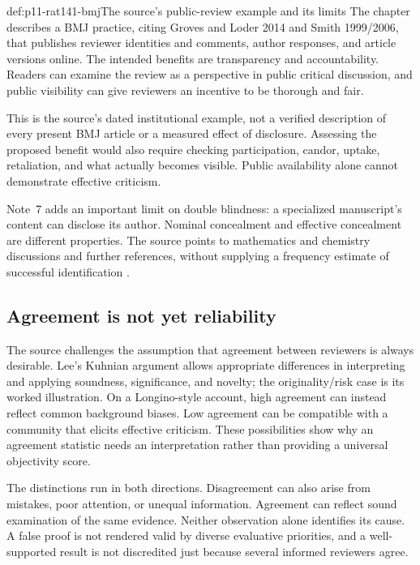 \begin{hbexample}{def:p11-rat141-bmj}{The source's public-review example and its limits}
The chapter describes a BMJ practice, citing Groves and Loder 2014
and Smith 1999/2006, that publishes reviewer identities and comments,
author responses, and article versions online. The intended benefits
are transparency and accountability. Readers can examine the review
as a perspective in public critical discussion, and public visibility
can give reviewers an incentive to be thorough and fair.

This is the source's dated institutional example, not a verified
description of every present BMJ article or a measured effect of
disclosure. Assessing the proposed benefit would also require checking
participation, candor, uptake, retaliation, and what actually becomes
visible. Public availability alone cannot demonstrate effective criticism.
\end{hbexample}

Note~7 adds an important limit on double blindness: a specialized
manuscript's content can disclose its author. Nominal concealment and
effective concealment are different properties. The source points to
mathematics and chemistry discussions and further references, without
supplying a frequency estimate of successful identification
\parencite[p.~752 and p.~753, n.~7]{AndersenAndersen2021Scientific}.

\subsection{Agreement is not yet reliability}

The source challenges the assumption that agreement between reviewers
is always desirable. Lee's Kuhnian argument allows appropriate
differences in interpreting and applying soundness, significance, and
novelty; the originality/risk case is its worked illustration. On a
Longino-style account, high agreement can instead reflect common
background biases. Low agreement can be compatible with a community
that elicits effective criticism. These possibilities show why an
agreement statistic needs an interpretation rather than providing a
universal objectivity score.

The distinctions run in both directions. Disagreement can also arise
from mistakes, poor attention, or unequal information. Agreement can
reflect sound examination of the same evidence. Neither observation
alone identifies its cause. A false proof is not rendered valid by
diverse evaluative priorities, and a well-supported result is not
discredited just because several informed reviewers agree.

